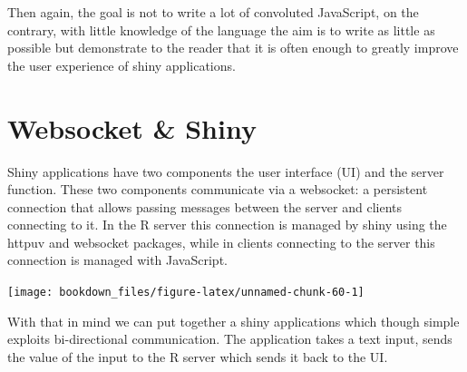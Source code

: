 \documentclass[
]{krantz}
\makeatletter
\newenvironment{Shaded}{\begin{snugshade}}{\end{snugshade}}
\newcommand{\ControlFlowTok}[1]{\textcolor[rgb]{0.27,0.27,0.27}{\textbf{#1}}}
\newcommand{\KeywordTok}[1]{\textcolor[rgb]{0.27,0.27,0.27}{\textbf{#1}}}
\newcommand{\NormalTok}[1]{#1}
\newcommand{\OperatorTok}[1]{\textcolor[rgb]{0.43,0.43,0.43}{\textbf{#1}}}
\newcommand{\StringTok}[1]{\textcolor[rgb]{0.5,0.5,0.5}{#1}}
\newenvironment{kframe}{%
\medskip{}
\setlength{\fboxsep}{.8em}
 \def\at@end@of@kframe{}%
 \ifinner\ifhmode%
  \def\at@end@of@kframe{\end{minipage}}%
  \begin{minipage}{\columnwidth}%
 \fi\fi%
 \def\FrameCommand##1{\hskip\@totalleftmargin \hskip-\fboxsep
 \colorbox{shadecolor}{##1}\hskip-\fboxsep
     \hskip-\linewidth \hskip-\@totalleftmargin \hskip\columnwidth}%
 \MakeFramed {\advance\hsize-\width
   \@totalleftmargin\z@ \linewidth\hsize
   \@setminipage}}%
 {\par\unskip\endMakeFramed%
 \at@end@of@kframe}
\renewenvironment{Shaded}{\begin{kframe}}{\end{kframe}}
\makeatother
\begin{document}
Then again, the goal is not to write a lot of convoluted JavaScript, on the contrary, with little knowledge of the language the aim is to write as little as possible but demonstrate to the reader that it is often enough to greatly improve the user experience of shiny applications.

\hypertarget{shiny-intro-websocket}{%
\section{Websocket \& Shiny}\label{shiny-intro-websocket}}

Shiny applications have two components the user interface (UI) and the server function. These two components communicate via a websocket: a persistent connection that allows passing messages between the server and clients connecting to it. In the R server this connection is managed by shiny using the httpuv \citep{R-httpuv} and websocket \citep{R-websocket} packages, while in clients connecting to the server this connection is managed with JavaScript.

\begin{center}\texttt{[image: bookdown\_files/figure-latex/unnamed-chunk-60-1]} \end{center}

With that in mind we can put together a shiny applications which though simple exploits bi-directional communication. The application takes a text input, sends the value of the input to the R server which sends it back to the UI.

\begin{Shaded}
\end{Shaded}
\end{document}
